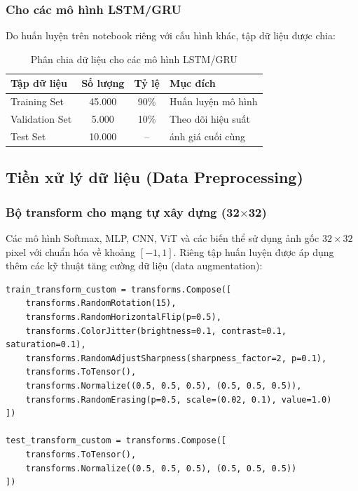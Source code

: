 \documentclass[a4paper]{article}
\theoremstyle{definition}
\begin{document}
\subsubsection{Cho các mô hình LSTM/GRU}
Do huấn luyện trên notebook riêng với cấu hình khác, tập dữ liệu được chia:

\begin{table}[H]
	\centering
	\caption{Phân chia dữ liệu cho các mô hình LSTM/GRU}
	\begin{tabular}{|l|c|c|l|}
		\hline
		\textbf{Tập dữ liệu} & \textbf{Số lượng} & \textbf{Tỷ lệ} & \textbf{Mục đích} \\ \hline
		Training Set          & 45.000            & 90\%           & Huấn luyện mô hình \\ \hline
		Validation Set        & 5.000             & 10\%           & Theo dõi hiệu suất \\ \hline
		Test Set              & 10.000            & --             & \DJ ánh giá cuối cùng \\ \hline
	\end{tabular}
	\label{tab:data-split-rnn}
\end{table}

\subsection{Tiền xử lý dữ liệu (Data Preprocessing)}

\subsubsection{Bộ transform cho mạng tự xây dựng (32$\times$32)}
Các mô hình Softmax, MLP, CNN, ViT và các biến thể sử dụng ảnh gốc $32 \times 32$ pixel với chuẩn hóa về khoảng $[-1, 1]$. Riêng tập huấn luyện được áp dụng thêm các kỹ thuật tăng cường dữ liệu (data augmentation):

\begin{verbatim}
train_transform_custom = transforms.Compose([
    transforms.RandomRotation(15),
    transforms.RandomHorizontalFlip(p=0.5),
    transforms.ColorJitter(brightness=0.1, contrast=0.1, saturation=0.1),
    transforms.RandomAdjustSharpness(sharpness_factor=2, p=0.1),
    transforms.ToTensor(),
    transforms.Normalize((0.5, 0.5, 0.5), (0.5, 0.5, 0.5)),
    transforms.RandomErasing(p=0.5, scale=(0.02, 0.1), value=1.0)
])

test_transform_custom = transforms.Compose([
    transforms.ToTensor(),
    transforms.Normalize((0.5, 0.5, 0.5), (0.5, 0.5, 0.5))
])
\end{verbatim}
\end{document}
